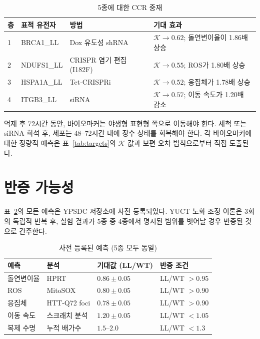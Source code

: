 \documentclass[12pt,a4paper]{article}
\newcommand{\REL}{\mathcal{K}}          %
\begin{document}
	\begin{table}[H]
		\centering
		\caption{5종에 대한 CCR 중재}
		\label{tab:CCR}
		\begin{tabular}{@{}llll@{}}
			\toprule
			\textbf{층} & \textbf{표적 유전자} & \textbf{방법} & \textbf{기대 효과} \\
			\midrule
			1 & BRCA1\_LL & Dox 유도성 shRNA & \(\REL \to 0.62\); 돌연변이율이 1.86배 상승 \\
			2 & NDUFS1\_LL & CRISPR 염기 편집 (I182F) & \(\REL \to 0.55\); ROS가 1.80배 상승 \\
			3 & HSPA1A\_LL & Tet‑CRISPRi & \(\REL \to 0.52\); 응집체가 1.78배 상승 \\
			4 & ITGB3\_LL & siRNA & \(\REL \to 0.57\); 이동 속도가 1.20배 감소 \\
			\bottomrule
		\end{tabular}
	\end{table}
	
	억제 후 72시간 동안, 바이오마커는 야생형 표현형 쪽으로 이동해야 한다. 세척 또는 siRNA 희석 후, 세포는 48–72시간 내에 장수 상태를 회복해야 한다. 각 바이오마커에 대한 정량적 예측은 표~\ref{tab:targets}의 \(\REL\) 값과 보편 오차 법칙으로부터 직접 도출된다.
	
	\section{반증 가능성}
	\label{sec:falsifiability}
	표~\ref{tab:predictions}의 모든 예측은 YPSDC 저장소에 사전 등록되었다. YUCT 노화 조정 이론은 3회의 독립적 반복 후, 실험 결과가 5종 중 4종에서 명시된 범위를 벗어날 경우 반증된 것으로 간주한다.
	
	\begin{table}[H]
		\centering
		\caption{사전 등록된 예측 (5종 모두 동일)}
		\label{tab:predictions}
		\begin{tabular}{@{}llll@{}}
			\toprule
			\textbf{예측} & \textbf{분석} & \textbf{기대값 (LL/WT)} & \textbf{반증 조건} \\
			\midrule
			돌연변이율       & HPRT           & \(0.86 \pm 0.05\) & LL/WT \(> 0.95\) \\
			ROS              & MitoSOX        & \(0.80 \pm 0.05\) & LL/WT \(> 0.90\) \\
			응집체           & HTT‑Q72 foci   & \(0.78 \pm 0.05\) & LL/WT \(> 0.90\) \\
			이동 속도        & 스크래치 분석  & \(1.20 \pm 0.05\) & LL/WT \(< 1.05\) \\
			복제 수명        & 누적 배가수    & \(1.5\)–\(2.0\)   & LL/WT \(< 1.3\) \\
			\bottomrule
		\end{tabular}
	\end{table}
	
\end{document}
